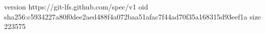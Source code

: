 version https://git-lfs.github.com/spec/v1
oid sha256:c5934227a80f0dee2aed488f4a072baa51afac7f44ad70f35a168315d93eef1a
size 223575
